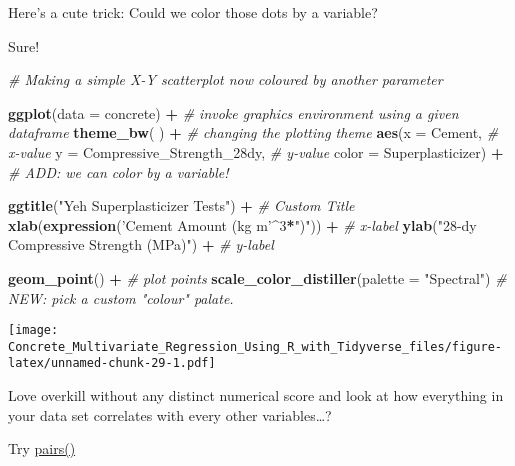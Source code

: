 \documentclass[]{article}
\newenvironment{Shaded}{\begin{snugshade}}{\end{snugshade}}
\newcommand{\CommentTok}[1]{\textcolor[rgb]{0.56,0.35,0.01}{\textit{#1}}}
\newcommand{\DataTypeTok}[1]{\textcolor[rgb]{0.13,0.29,0.53}{#1}}
\newcommand{\DecValTok}[1]{\textcolor[rgb]{0.00,0.00,0.81}{#1}}
\newcommand{\KeywordTok}[1]{\textcolor[rgb]{0.13,0.29,0.53}{\textbf{#1}}}
\newcommand{\NormalTok}[1]{#1}
\newcommand{\OperatorTok}[1]{\textcolor[rgb]{0.81,0.36,0.00}{\textbf{#1}}}
\newcommand{\StringTok}[1]{\textcolor[rgb]{0.31,0.60,0.02}{#1}}
\begin{document}
Here's a cute trick: Could we color those dots by a variable?

Sure!

\begin{Shaded}
\begin{Highlighting}[]
\CommentTok{# Making a simple X-Y scatterplot now coloured by another parameter}

\KeywordTok{ggplot}\NormalTok{(}\DataTypeTok{data =}\NormalTok{ concrete) }\OperatorTok{+}\StringTok{                }\CommentTok{# invoke graphics environment using a given dataframe}
\StringTok{  }
\StringTok{  }\KeywordTok{theme_bw}\NormalTok{( ) }\OperatorTok{+}\StringTok{                           }\CommentTok{# changing the plotting theme}
\StringTok{  }
\StringTok{  }\KeywordTok{aes}\NormalTok{(}\DataTypeTok{x      =}\NormalTok{ Cement,                       }\CommentTok{# x-value}
      \DataTypeTok{y      =}\NormalTok{ Compressive_Strength_28dy,    }\CommentTok{# y-value}
      \DataTypeTok{color  =}\NormalTok{ Superplasticizer)          }\OperatorTok{+}\StringTok{  }\CommentTok{# ADD: we can color by a variable!}

\StringTok{  }\KeywordTok{ggtitle}\NormalTok{(}\StringTok{"Yeh Superplasticizer Tests"}\NormalTok{) }\OperatorTok{+}\StringTok{    }\CommentTok{# Custom Title}
\StringTok{  }
\StringTok{  }\KeywordTok{xlab}\NormalTok{(}\KeywordTok{expression}\NormalTok{(}\StringTok{'Cement Amount (kg m'}\OperatorTok{^}\DecValTok{3}\OperatorTok{*}\StringTok{")"}\NormalTok{)) }\OperatorTok{+}\StringTok{   }\CommentTok{# x-label}
\StringTok{  }\KeywordTok{ylab}\NormalTok{(}\StringTok{"28-dy Compressive Strength (MPa)"}\NormalTok{)      }\OperatorTok{+}\StringTok{   }\CommentTok{# y-label}

\StringTok{  }\KeywordTok{geom_point}\NormalTok{() }\OperatorTok{+}\StringTok{  }\CommentTok{# plot points }
\StringTok{  }\KeywordTok{scale_color_distiller}\NormalTok{(}\DataTypeTok{palette =} \StringTok{"Spectral"}\NormalTok{) }\CommentTok{# NEW: pick a custom "colour" palate.}
\end{Highlighting}
\end{Shaded}

\texttt{[image: Concrete\_Multivariate\_Regression\_Using\_R\_with\_Tidyverse\_files/figure-latex/unnamed-chunk-29-1.pdf]}

Love overkill without any distinct numerical score and look at how
everything in your data set correlates with every other
variables\ldots{}?

Try
\href{https://www.rdocumentation.org/packages/graphics/versions/3.5.1/topics/pairs}{pairs()}
\end{document}

